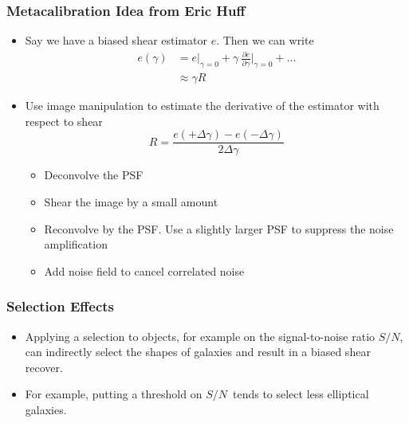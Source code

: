 \documentclass{beamer}
\newcommand{\snr}{$S/N$}
\newcommand{\mest}{e}
\begin{document}
\frame
{
    \frametitle{Metacalibration Idea from Eric Huff}

 
    \begin{itemize}

        \item Say we have a biased shear estimator {\color{gold} $e$}.  Then we can write
            {\color{gold}
                \begin{align} \label{eq:Eexpand}
                    \mest(\gamma) &= \mest|_{\gamma=0} + \gamma ~ \frac{ \partial \mest }{ \partial \gamma }\bigg|_{\gamma=0}  + ... \nonumber \\
                                  &\approx \gamma R \nonumber
                \end{align}
            } 
        \item Use image manipulation to estimate the derivative of the
            estimator with respect to shear
            {\color{gold}
                \begin{equation}
                    R = \frac{\mest(+\Delta\gamma) - \mest(-\Delta\gamma)}{2 \Delta \gamma} \nonumber 
                \end{equation}
            }
            \begin{itemize}
                \item Deconvolve the PSF
                \item Shear the image by a small amount
                \item Reconvolve by the PSF.  Use a slightly larger PSF to suppress
                    the noise amplification
                \item Add noise field to cancel correlated noise
            \end{itemize}


    \end{itemize}

}



\frame
{
    \frametitle{Selection Effects}

 

    \begin{itemize}

        \item  Applying a selection to objects, for example on the signal-to-noise
            ratio \snr, can indirectly select the shapes of galaxies and result
            in a biased shear recover.

        \item For example, putting a threshold on \snr\ tends to select less
            elliptical galaxies.

    \end{itemize}

}
\end{document}
